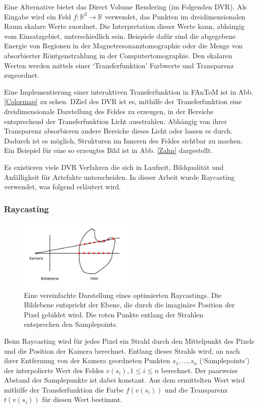 \documentclass[a4paper,fontsize=12pt,toc=bib,halfparskip]{scrartcl}
\begin{document}
Eine Alternative bietet das Direct Volume Rendering\cite{drebin1988volume} (im Folgenden DVR). Als Eingabe wird ein Feld $f: \mathbb{R}^3\rightarrow\mathbb{R}$ verwendet, das Punkten im dreidimensionalen Raum skalare Werte zuordnet. Die Interpretation dieser Werte kann, abh\"angig vom Einsatzgebiet, unterschiedlich sein. Beispiele daf\"ur sind die abgegebene Energie von Regionen in der Magnetresonanztomographie oder die Menge von absorbierter R\"ontgenstrahlung in der Computertomographie. Den skalaren Werten werden mittels einer `Transferfunktion' Farbwerte und Transparenz zugeordnet.

Eine Implementierung einer interaktiven Transferfunktion in FAnToM ist in Abb. \ref{Colormap} zu sehen. DZiel des DVR ist es, mithilfe der Transferfunktion eine dreidimensionale Darstellung des Feldes zu erzeugen, in der Bereiche entsprechend der Transferfunktion Licht ausstrahlen. Abh\"angig von ihrer Transparenz absorbieren andere Bereiche dieses Licht oder lassen es durch. Dadurch ist es m\"oglich, Strukturen im Inneren des Feldes sichtbar zu machen. Ein Beispiel f\"ur eine so erzeugtes Bild ist in Abb. \ref{Zahn} dargestellt.

Es existieren viele DVR Verfahren die sich in Laufzeit, Bildqualit\"at und Anf\"alligkeit f\"ur Artefakte unterscheiden. In dieser Arbeit wurde Raycasting verwendet, was folgend erl\"autert wird.

\subsubsection{Raycasting}
\label{sec:Raycasting}
\begin{figure}
	\centering
	\includegraphics[width=0.5\textwidth]{pictures/Raycasting}
	\caption{Eine vereinfachte Darstellung eines optimierten Raycastings. Die Bildebene entspricht der Ebene, die durch die imagin\"are Position der Pixel gebildet wird. Die roten Punkte entlang der Strahlen entsprechen den Samplepoints.}
	\label{Raycasting}
\end{figure}
Beim Raycasting wird f\"ur jedes Pixel ein Strahl durch den Mittelpunkt des Pixels und die Position der Kamera berechnet. Entlang dieses Strahls wird, an nach ihrer Entfernung von der Kamera geordneten Punkten  $s_1, \dots, s_n$ (`Samplepoints') der interpolierte Wert des Feldes $v(s_i), 1\leq i\leq n$ berechnet. Der paarweise Abstand der Samplepunkte ist dabei konstant. Aus dem ermittelten Wert wird mithilfe der Transferfunktion die Farbe $f(v(s_i))$ und die Transparenz $t(v(s_i))$ f\"ur diesen Wert bestimmt.
\end{document}
